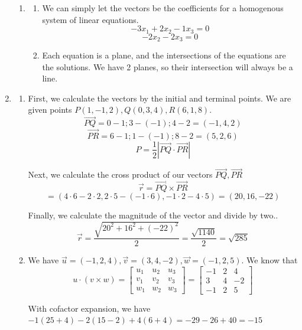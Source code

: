 \documentclass[11pt, letterpaper, twoside]{article}
\begin{document}
\begin{enumerate}
\begin{enumerate}[label=\alph*)]
\item \begin{enumerate}[label=\roman*)]
\item We can simply let the vectors be the coefficients for a homogenous system of linear equations.
\[-3x_1+2x_2-1x_3=0\]
\[-2x_2-2x_3=0\]
\item Each equation is a plane, and the intersections of the equations are the solutions.
We have 2 planes, so their intersection will always be a line.
\end{enumerate}
\end{enumerate}
\item \begin{enumerate}[label=\alph*)]
\item First, we calculate the vectors by the initial and terminal points.
We are given points \(P(1,-1,2),Q(0,3,4),R(6,1,8)\).
\[\vec{PQ}=0-1;3-(-1);4-2=(-1,4,2)\]
\[\vec{PR}=6-1;1-(-1);8-2=(5,2,6)\]
\[P=\frac{1}{2}|\vec{PQ}\cdot\vec{PR}|\]

Next, we calculate the cross product of our vectors \(\vec{PQ}, \vec{PR}\)
\[\vec r = \vec {PQ} \times \vec {PR}\]
\[=(4\cdot6-2\cdot2, 2\cdot5-(-1\cdot6), -1\cdot2-4\cdot5)=(20, 16, -22)\]

Finally, we calculate the magnitude of the vector and divide by two.. 
\[\vec r = \frac{\sqrt{20^2+16^2+(-22)^2}}{2}=\frac{\sqrt{1140}}{2}=\boxed{\sqrt{285}}\]
\item We have \(\vec u =(-1,2,4), \vec v=(3,4,-2), \vec w=(-1,2,5)\). 
We know that 
\[u\cdot(v\times w)=\begin{bmatrix}
    u_1&u_2&u_3\\
    v_1&v_2&v_3\\
    w_1&w_2&w_3
\end{bmatrix}=\begin{bmatrix}
    -1&2&4\\
    3&4&-2\\
    -1&2&5
\end{bmatrix}\]

With cofactor expansion, we have \(-1(25+4)-2(15-2)+4(6+4)=-29-26+40=-15\)
\end{enumerate}
\end{enumerate}
\end{document}
